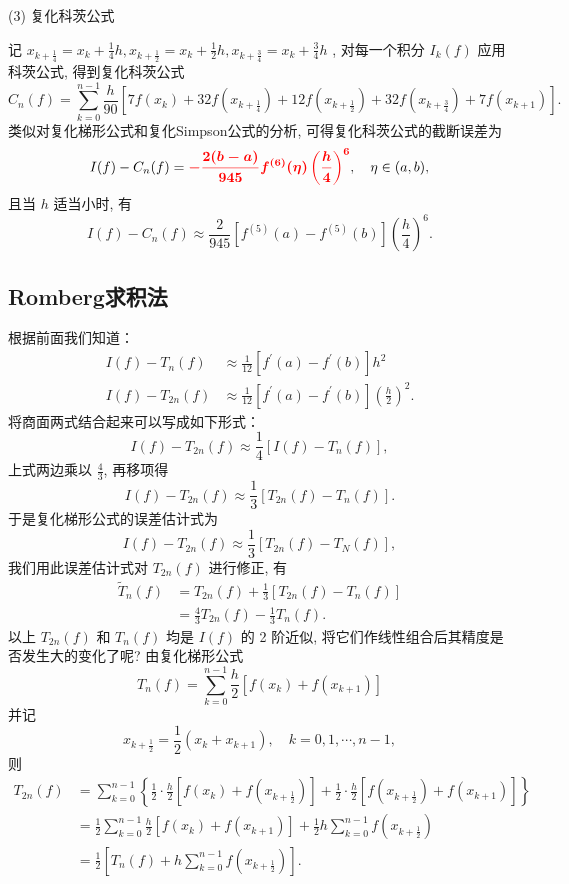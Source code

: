 (3) 复化科茨公式

记 $x_{k+\frac{1}{4}}=x_{k}+\frac{1}{4} h, x_{k+\frac{1}{2}}=x_{k}+\frac{1}{2} h, x_{k+\frac{3}{4}}=x_{k}+\frac{3}{4} h$ , 对每一个积分 $I_{k}(f)$  应用科茨公式, 得到复化科茨公式
$$
C_{n}(f)=\sum_{k=0}^{n-1} \frac{h}{90}\left[7 f\left(x_{k}\right)+32 f\left(x_{k+\frac{1}{4}}\right)+12 f\left(x_{k+\frac{1}{2}}\right)+32 f\left(x_{k+\frac{3}{4}}\right)+7 f\left(x_{k+1}\right)\right] .
$$
类似对复化梯形公式和复化Simpson公式的分析, 可得复化科茨公式的截断误差为
$$
I(f)-C_{n}(f)=\textcolor{red}{\bm{-\frac{2(b-a)}{945} f^{(6)}(\eta)\left(\frac{h}{4}\right)^{6}}}, \quad \eta \in(a, b),
$$
且当 $ h $ 适当小时, 有
$$
I(f)-C_{n}(f) \approx \frac{2}{945}\left[f^{(5)}(a)-f^{(5)}(b)\right]\left(\frac{h}{4}\right)^{6} .
$$

\subsection{Romberg求积法}
根据前面我们知道：
$$\begin{aligned}
    I(f)-T_{n}(f) &\approx \frac{1}{12}\left[f^{\prime}(a)-f^{\prime}(b)\right] h^{2} \\
    I(f)-T_{2 n}(f) &\approx \frac{1}{12}\left[f^{\prime}(a)-f^{\prime}(b)\right]\left(\frac{h}{2}\right)^{2} .
\end{aligned}
$$
将商面两式结合起来可以写成如下形式：
$$
I(f)-T_{2 n}(f) \approx \frac{1}{4}\left[I(f)-T_{n}(f)\right],
$$
上式两边乘以 $ \frac{4}{3} $, 再移项得
$$
I(f)-T_{2 n}(f) \approx \frac{1}{3}\left[T_{2 n}(f)-T_{n}(f)\right] .
$$
于是复化梯形公式的误差估计式为
$$
I(f)-T_{2 n}(f) \approx \frac{1}{3}\left[T_{2 n}(f)-T_{N}(f)\right],
$$
我们用此误差估计式对 $ T_{2 n}(f) $ 进行修正, 有
$$
\begin{aligned}
\widetilde{T}_{n}(f) & =T_{2 n}(f)+\frac{1}{3}\left[T_{2 n}(f)-T_{n}(f)\right] \\
& =\frac{4}{3} T_{2 n}(f)-\frac{1}{3} T_{n}(f) .
\end{aligned}
$$
以上 $ T_{2 n}(f) $ 和 $ T_{n}(f) $ 均是 $ I(f) $ 的 2 阶近似, 将它们作线性组合后其精度是否发生大的变化了呢? 由复化梯形公式
$$
T_{n}(f)=\sum_{k=0}^{n-1} \frac{h}{2}\left[f\left(x_{k}\right)+f\left(x_{k+1}\right)\right]
$$
并记
$$
x_{k+\frac{1}{2}}=\frac{1}{2}\left(x_{k}+x_{k+1}\right), \quad k=0,1, \cdots, n-1,
$$
则
$$
\begin{aligned}
T_{2 n}(f) & =\sum_{k=0}^{n-1}\left\{\frac{1}{2} \cdot \frac{h}{2}\left[f\left(x_{k}\right)+f\left(x_{k+\frac{1}{2}}\right)\right]+\frac{1}{2} \cdot \frac{h}{2}\left[f\left(x_{k+\frac{1}{2}}\right)+f\left(x_{k+1}\right)\right]\right\} \\
& =\frac{1}{2} \sum_{k=0}^{n-1} \frac{h}{2}\left[f\left(x_{k}\right)+f\left(x_{k+1}\right)\right]+\frac{1}{2} h \sum_{k=0}^{n-1} f\left(x_{k+\frac{1}{2}}\right) \\
& =\frac{1}{2}\left[T_{n}(f)+h \sum_{k=0}^{n-1} f\left(x_{k+\frac{1}{2}}\right)\right] .
\end{aligned}
$$
